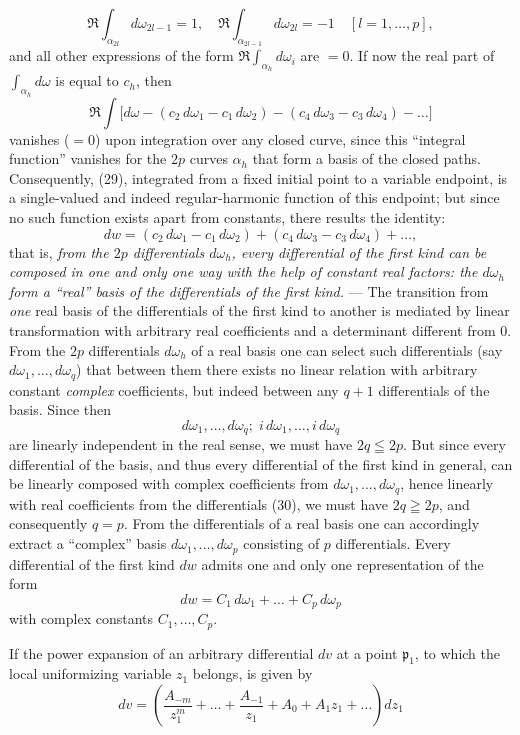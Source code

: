 \documentclass{article}
\begin{document}
\[ \Re \int_{\alpha_{2l}} d\omega_{2l-1} = 1, \quad \Re \int_{\alpha_{2l-1}} d\omega_{2l} = -1 \quad [l = 1, \dots, p], \]
and all other expressions of the form $\Re \displaystyle\int_{\alpha_h} d\omega_i$ are $= 0$. If now the real part of $\displaystyle\int_{\alpha_h} d\omega$ is equal to $c_h$, then
\[ \Re \int \bigl[ d\omega - (c_2\,d\omega_1 - c_1\,d\omega_2) - (c_4\,d\omega_3 - c_3\,d\omega_4) - \dots \bigr] \tag{29} \]
vanishes ($= 0$) upon integration over any closed curve, since this ``integral function'' vanishes for the $2p$ curves $\alpha_h$ that form a basis of the closed paths. Consequently, (29), integrated from a fixed initial point to a variable endpoint, is a single-valued and indeed regular-harmonic function of this endpoint; but since no such function exists apart from constants, there results the identity:
\[ dw = (c_2\,d\omega_1 - c_1\,d\omega_2) + (c_4\,d\omega_3 - c_3\,d\omega_4) + \dots, \]
that is, \emph{from the $2p$ differentials $d\omega_h$, every differential of the first kind can be composed in one and only one way with the help of constant real factors: the $d\omega_h$ form a ``real'' basis of the differentials of the first kind.} --- The transition from \emph{one} real basis of the differentials of the first kind to another is mediated by linear transformation with arbitrary real coefficients and a determinant different from $0$. From the $2p$ differentials $d\omega_h$ of a real basis one can select such differentials (say $d\omega_1, \dots, d\omega_q$) that between them there exists no linear relation with arbitrary constant \emph{complex} coefficients, but indeed between any $q+1$ differentials of the basis. Since then
\[ d\omega_1, \dots, d\omega_q; \; i\,d\omega_1, \dots, i\,d\omega_q \tag{30} \]
are linearly independent in the real sense, we must have $2q \leqq 2p$. But since every differential of the basis, and thus every differential of the first kind in general, can be linearly composed with complex coefficients from $d\omega_1, \dots, d\omega_q$, hence linearly with real coefficients from the differentials (30), we must have $2q \geqq 2p$, and consequently $q=p$. From the differentials of a real basis one can accordingly extract a ``complex'' basis $d\omega_1, \dots, d\omega_p$ consisting of $p$ differentials. Every differential of the first kind $dw$ admits one and only one representation of the form
\[ dw = C_1\,d\omega_1 + \dots + C_p\,d\omega_p \]
with complex constants $C_1, \dots, C_p$.

If the power expansion of an arbitrary differential $dv$ at a point $\mathfrak{p}_1$, to which the local uniformizing variable $z_1$ belongs, is given by
\[ dv = \left( \frac{A_{-m}}{z_1^m} + \dots + \frac{A_{-1}}{z_1} + A_0 + A_1 z_1 + \dots \right) dz_1 \]
\end{document}
